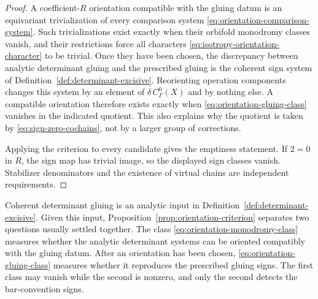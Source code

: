\documentclass[11pt,letterpaper,twoside]{article}
\theoremstyle{plain}
\theoremstyle{definition}
\theoremstyle{remark}
\begin{document}
\begin{proof}
A coefficient-$R$ orientation compatible with the gluing datum is an equivariant trivialization of every comparison system \eqref{eq:orientation-comparison-system}.  Such trivializations exist exactly when their orbifold monodromy classes vanish, and their restrictions force all characters \eqref{eq:isotropy-orientation-character} to be trivial.  Once they have been chosen, the discrepancy between analytic determinant gluing and the prescribed gluing is the coherent sign system of Definition~\ref{def:determinant-excisive}.  Reorienting operation components changes this system by an element of $\delta\,C^0_\Gamma(X)$ and by nothing else.  A compatible orientation therefore exists exactly when \eqref{eq:orientation-gluing-class} vanishes in the indicated quotient.  This also explains why the quotient is taken by \eqref{eq:sign-zero-cochains}, not by a larger group of corrections.

Applying the criterion to every candidate gives the emptiness statement.  If $2=0$ in $R$, the sign map has trivial image, so the displayed sign classes vanish.  Stabilizer denominators and the existence of virtual chains are independent requirements.
\end{proof}

Coherent determinant gluing is an analytic input in Definition~\ref{def:determinant-excisive}.  Given this input, Proposition~\ref{prop:orientation-criterion} separates two questions usually settled together.  The class \eqref{eq:orientation-monodromy-class} measures whether the analytic determinant systems can be oriented compatibly with the gluing datum.  After an orientation has been chosen, \eqref{eq:orientation-gluing-class} measures whether it reproduces the prescribed gluing signs.  The first class may vanish while the second is nonzero, and only the second detects the bar-convention signs.
\end{document}
